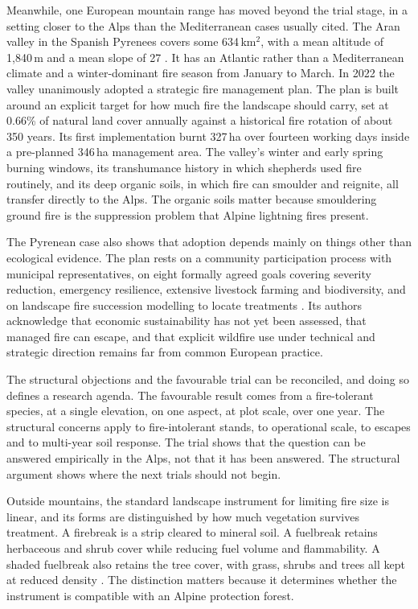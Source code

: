 \documentclass[11pt,a4paper]{article}
\begin{document}
Meanwhile, one European mountain range has moved beyond the trial stage, in a setting closer to the Alps than the Mediterranean cases usually cited. The Aran valley in the Spanish Pyrenees covers some 634\,km$^2$, with a mean altitude of 1{,}840\,m and a mean slope of 27\degree{} \citep{oliveres_path_2025}. It has an Atlantic rather than a Mediterranean climate and a winter-dominant fire season from January to March. In 2022 the valley unanimously adopted a strategic fire management plan. The plan is built around an explicit target for how much fire the landscape should carry, set at 0.66\% of natural land cover annually against a historical fire rotation of about 350 years. Its first implementation burnt 327\,ha over fourteen working days inside a pre-planned 346\,ha management area. The valley's winter and early spring burning windows, its transhumance history in which shepherds used fire routinely, and its deep organic soils, in which fire can smoulder and reignite, all transfer directly to the Alps. The organic soils matter because smouldering ground fire is the suppression problem that Alpine lightning fires present.

The Pyrenean case also shows that adoption depends mainly on things other than ecological evidence. The plan rests on a community participation process with municipal representatives, on eight formally agreed goals covering severity reduction, emergency resilience, extensive livestock farming and biodiversity, and on landscape fire succession modelling to locate treatments \citep{oliveres_path_2025}. Its authors acknowledge that economic sustainability has not yet been assessed, that managed fire can escape, and that explicit wildfire use under technical and strategic direction remains far from common European practice.

The structural objections and the favourable trial can be reconciled, and doing so defines a research agenda. The favourable result comes from a fire-tolerant species, at a single elevation, on one aspect, at plot scale, over one year. The structural concerns apply to fire-intolerant stands, to operational scale, to escapes and to multi-year soil response. The trial shows that the question can be answered empirically in the Alps, not that it has been answered. The structural argument shows where the next trials should not begin.

Outside mountains, the standard landscape instrument for limiting fire size is linear, and its forms are distinguished by how much vegetation survives treatment. A firebreak is a strip cleared to mineral soil. A fuelbreak retains herbaceous and shrub cover while reducing fuel volume and flammability. A shaded fuelbreak also retains the tree cover, with grass, shrubs and trees all kept at reduced density \citep{ascoli_firebreak_2018}. The distinction matters because it determines whether the instrument is compatible with an Alpine protection forest.
\end{document}
